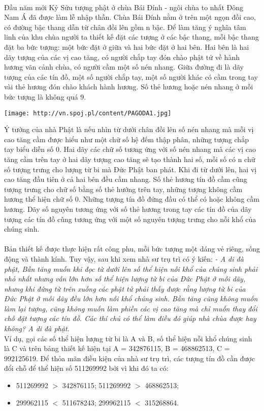 

 

Đầu năm mới Kỷ Sửu tượng phật ở chùa Bái Đính - ngôi chùa to nhất Đông Nam Á đã được làm lễ nhập thần. Chùa Bái Đính nằm ở trên một ngọn đồi cao, có đường bậc thang dẫn từ chân đồi lên gồm n bậc. Để làm tăng ý nghĩa tâm linh của khu chùa người ta thiết kế đặt các tượng ở các bậc thang, mỗi bậc thang đặt ba bức tượng: một bức đặt ở giữa và hai bức đặt ở hai bên. Hai bên là hai dãy tượng của các vị cao tăng, có người chắp tay đón chào phật tử về hành hương vãn cảnh chùa, có người cầm một số nén nhang. Giữa đường đi là dãy tượng của các tín đồ, một số người chắp tay, một số người khác có cầm trong tay vài thẻ hương đón chào khách hành hương. Số thẻ hương hoặc nén nhang ở mỗi bức tượng là không quá 9.


\texttt{[image: http://vn.spoj.pl/content/PAGODA1.jpg]}

Ý tưởng của nhà Phật là nếu nhìn từ dưới chân đồi lên số nén nhang mà mỗi vị cao tăng cầm được hiểu như một chữ số hệ đếm thập phân, những tượng chắp tay biểu diễn số 0. Hai dãy các chữ số tương ứng với số nén nhang mà các vị cao tăng cầm trên tay ở hai dãy tượng cao tăng sẽ tạo thành hai số, mỗi số có n chữ số tượng trưng cho lượng từ bi mà Đức Phật ban phát. Khi đi từ dưới lên, hai vị cao tăng đầu tiên ở cả hai bên đều cầm nhang. Số thẻ hương tín đồ cầm cũng tượng trưng cho chữ số bằng số thẻ hướng trên tay, những tượng không cầm hương thể hiện chữ số 0. Những tượng tín đồ đứng đầu có thể có hoặc không cầm hương. Dãy số nguyên tương ứng với số thẻ hương trong tay các tín đồ của dãy tượng các tín đồ cũng tương ứng với một số nguyên tượng trưng cho nỗi khổ của chúng sinh.
\\
\\Bản thiết kế được thực hiện rất công phu, mỗi bức tượng một dáng vẻ riêng, sống động và thành kính. Tuy vậy, sau khi xem nhà sư trụ trì có ý kiến: \emph{ - A di đà phật, Bần tăng muốn khi đọc từ dưới lên số thể hiện nỗi khổ của chúng sinh phải nhỏ nhất nhưng vẫn lớn hơn số thể hiện lượng từ bi của Đức Phật ở mỗi dãy, nhưng khi đứng từ trên xuống các phật tử phải thấy được rằng lượng từ bi của Đức Phật ở mỗi dãy đều lớn hơn nỗi khổ chúng sinh. Bần tăng cũng không muốn làm lại tượng, cũng không muốn làm phiền các vị cao tăng mà chỉ muốn thay đổi chỗ đặt tượng các tín đồ. Các thí chủ có thể làm điều đó giúp nhà chùa được hay không? A di đà phật. }
\\Ví dụ, gọi các số thể hiện lượng từ bi là A và B, số thể hiện nỗi khổ chúng sinh là C và trên bảng thiết kế hiện tại A = 342876115, B = 468862513, C = 992125619. Để thỏa mãn điều kiện của nhà sư trụ trì, các tượng tín đồ cần được đổi chỗ để thể hiện số 511269992 bởi vì khi đó ta có:
\begin{itemize}
	\item 511269992 $>$ 342876115; 511269992 $>$ 468862513;
	\item 299962115 $<$ 511678243; 299962115 $<$ 315268864.
\end{itemize}


